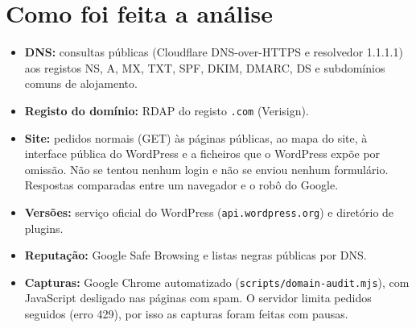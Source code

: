\documentclass[11pt,a4paper]{article}
\begin{document}
\section{Como foi feita a análise}
\begin{itemize}
  \item \textbf{DNS:} consultas públicas (Cloudflare DNS-over-HTTPS e resolvedor 1.1.1.1) aos registos NS,
        A, MX, TXT, SPF, DKIM, DMARC, DS e subdomínios comuns de alojamento.
  \item \textbf{Registo do domínio:} RDAP do registo \texttt{.com} (Verisign).
  \item \textbf{Site:} pedidos normais (GET) às páginas públicas, ao mapa do site, à interface pública do
        WordPress e a ficheiros que o WordPress expõe por omissão. Não se tentou nenhum login e não se
        enviou nenhum formulário. Respostas comparadas entre um navegador e o robô do Google.
  \item \textbf{Versões:} serviço oficial do WordPress (\texttt{api.wordpress.org}) e diretório de plugins.
  \item \textbf{Reputação:} Google Safe Browsing e listas negras públicas por DNS.
  \item \textbf{Capturas:} Google Chrome automatizado (\texttt{scripts/domain-audit.mjs}), com JavaScript
        desligado nas páginas com spam. O servidor limita pedidos seguidos (erro 429), por isso as capturas
        foram feitas com pausas.
\end{itemize}
\end{document}
